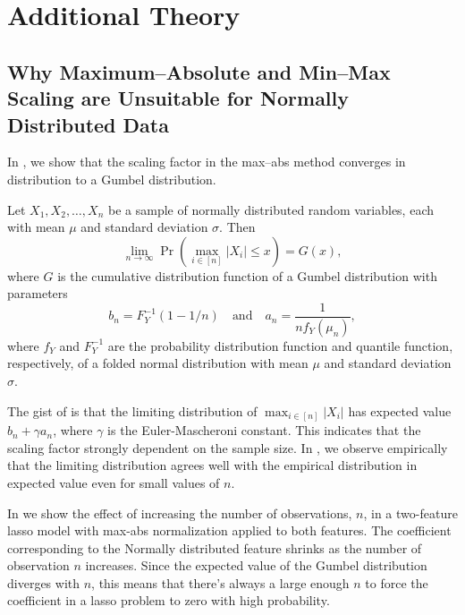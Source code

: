 \section{Additional Theory}
\label{sec:additional-theory}

\subsection{Why Maximum--Absolute and Min--Max Scaling are Unsuitable for Normally Distributed Data}

In , we show that the scaling factor in the max--abs method converges in distribution to a Gumbel distribution.

\begin{theorem}
  \label{thm:maxabs-gev}
  Let \(X_1, X_2, \dots, X_n\) be a sample of normally distributed random variables, each with mean \(\mu\) and standard deviation \(\sigma\). Then
  \[
    \lim_{n \rightarrow \infty}\Pr\left(\max_{i \in [n]} |X_i| \leq x\right) = G(x),
  \]
  where \(G\) is the cumulative distribution function of a Gumbel distribution with
  parameters
  \[
    b_n = F_Y^{-1}(1 - 1/n)\quad \text{and} \quad a_n = \frac{1}{n f_Y(\mu_n)},
  \]
  where \(f_Y\) and \(F_Y^{-1}\) are the probability distribution function and quantile function, respectively, of a folded normal distribution with mean \(\mu\) and standard deviation \(\sigma\).
\end{theorem}

The gist of  is that the limiting distribution of \(\max_{i \in [n]}|X_i|\) has expected value \(b_n + \gamma a_n\), where \(\gamma\) is the Euler-Mascheroni constant. This indicates that the scaling factor strongly dependent on the sample size. In , we observe empirically that the limiting distribution agrees well with the empirical distribution in expected value even for small values of \(n\).

In  we show the effect of increasing the number of observations, \(n\), in a two-feature lasso model with max-abs normalization applied to both features. The coefficient corresponding to the Normally distributed feature shrinks as the number of observation \(n\) increases. Since the expected value of the Gumbel distribution diverges with \(n\), this means that there's always a large enough \(n\) to force the coefficient in a lasso problem to zero with high probability.

